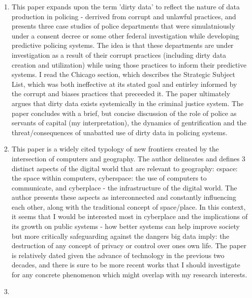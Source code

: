 \documentclass{article}
\begin{document}
\begin{enumerate}
\item \cite{richardson2019DirtyData}

This paper expands upon the term 'dirty data' to reflect the nature of
data production in policing - derrived from corrupt and unlawful
practices, and presents three case studies of police departments that
were simulatniously under a consent decree or some other federal
investigation while developing predictive policing systems. The idea
is that these departments are under investigation as a result of their
corrupt practices (including dirty data creation and utilization)
while using those practices to inform their predictive systems. I read
the Chicago section, which describes the Strategic Subject List, which
was both ineffective at its stated goal and entirley informed by the
corrupt and biases practices that preceeded it. The paper ultimately
argues that dirty data exists systemically in the criminal justice
system. The paper concludes with a brief, but concise discussion of
the role of police as servants of capital (my interpretation), the
dynamics of gentrification and the threat/consequences of unabatted
use of dirty data in policing systems.


\item \cite{batty1997VirtualGeography}

This paper is a widely cited typology of new frontiers created by the
intersection of computers and geography. The author delineates and
defines 3 distinct aspects of the digital world that are relevant to
geography: cspace: the space within computers, cyberspace: the use of
computers to communicate, and cyberplace - the infrastructure of the
digital world. The author presents these aspects as interconnected and
constantly influencing each other, along with the traditional concept
of space/place. In this context, it seems that I would be interested
most in cyberplace and the implications of its growth on public
systems - how better systems can help improve society but more
critically safeguarding against the dangers big data imply: the
destruction of any concept of privacy or control over ones own
life. The paper is relatively dated given the advance of technology in
the previous two decades, and there is sure to be more recent works
that I should investigate for any concrete phenomenon which might
overlap with my research interests.

\item \cite {speer2016RightInfrastructure}


\end{enumerate}
\end{document}
